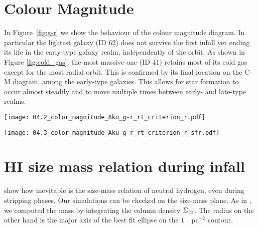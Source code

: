 \section{Colour Magnitude}
In Figure~\ref{fig:g-r} we show the behaviour of the colour magnitude diagram.
In particular the lightest galaxy (ID 62) does not survive the first infall yet ending its life in the early-type galaxy realm, independently of the orbit.
As shown in Figure \ref{fig:cold_gas}, the most massive one (ID 41) retains most of its cold gas except for the most radial orbit.
This is confirmed by its final location on the C-M diagram, among the early-type galaxies.
This allows for star formation to occur almost steadily and to move multiple times between early- and late-type realms.


\begin{sidewaysfigure}
\centering
\texttt{[image: 04.2\_color\_magnitude\_Aku\_g-r\_rt\_criterion\_r.pdf]}
\caption{SDSS bands colour magnitude diagram of galaxies on different orbits compared to Fornax dwarf catalogue of \citet{Venhola2019}.
Red and blue colour for the data points in the background represent dwarf elliptical (dE) and late type galaxy respectively, classified by eye on the base of morphology.
Empty squares are nucleated dE.
Data tracks of simulated galaxies are shown overlaid colour coded by the clustercentric radius.
The tracks are limited to bound galaxies i.e. they are drawn with snapshots for which condition \eqref{eq:tidal_radius_condition} holds.
}
\label{fig:g-r}
\end{sidewaysfigure}
\begin{sidewaysfigure}
\centering
\texttt{[image: 04.3\_color\_magnitude\_Aku\_g-r\_rt\_criterion\_r\_sfr.pdf]}
\caption{Same as Figure~\ref{fig:g-r}, with point color coded with the specific star formation rate.
Black points are snapshots with no star formation.
}
\label{fig:g-r_sfr}
\end{sidewaysfigure}


\section{HI size mass relation during infall}
\citet{Stevens2019} show how inevitable is the size-mass relation of neutral hydrogen, even during stripping phases.
Our simulations can be checked on the size-mass plane.
As in \citet{Verbeke2017}, we computed the \Hi{} mass by integrating the \Hi{} column density $\Sigma_{\text{H\textsc{i}}}$. The radius on the other hand is the major axis of the best fit ellipse on the $1$~\Msun{}~pc$^{-2}$ contour.

